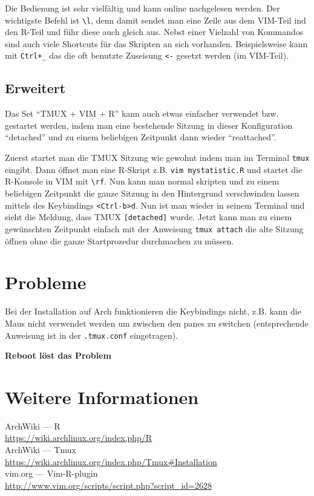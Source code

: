 \documentclass[a4paper,
               10pt,
               fleqn]{article}
\begin{document}
Die Bedienung ist sehr vielfältig und kann online nachgelesen werden.
Der wichtigste Befehl ist \verb!\l!, denn damit sendet man eine Zeile
aus dem VIM-Teil ind den R-Teil und führ diese auch gleich aus.
Nebst einer Vielzahl von Kommandos sind auch viele Shortcuts für das
Skripten an sich vorhanden. Beispielsweise kann mit \verb!Ctrl+_!
das die oft benutzte Zuseisung \verb!<-! gesetzt werden (im VIM-Teil).

\subsection{Erweitert}
Das Set ``TMUX + VIM + R'' kann auch etwas einfacher verwendet bzw.
gestartet werden, indem man eine bestehende Sitzung in dieser 
Konfiguration ``detached'' und zu einem beliebigen Zeitpunkt dann
wieder ``reattached''. 

Zuerst startet man die TMUX Sitzung wie gewohnt indem man im Terminal
\verb!tmux! eingibt. Dann öffnet man eine R-Skript z.B. 
\verb!vim mystatistic.R! und startet die R-Konsole in VIM mit
\verb!\rf!. Nun kann man normal skripten und zu einem beliebigen 
Zeitpunkt die ganze Sitzung in den Hintergrund verschwinden lassen
mittels des Keybindings \verb!<Ctrl-b>d!. Nun ist man wieder in seinem
Terminal und sieht die Meldung, dass TMUX \verb![detached]! wurde.
Jetzt kann man zu einem gewünschten Zeitpunkt einfach mit der Anweisung
\verb!tmux attach! die alte Sitzung öffnen ohne die ganze Startprozedur
durchmachen zu müssen.

\section{Probleme}
Bei der Installation auf Arch funktionieren die Keybindings nicht,
z.B. kann die Maus nicht verwendet werden um zwischen den panes zu 
switchen (entsprechende Anweisung ist in der \verb!.tmux.conf!
eingetragen).

\textbf{Reboot löst das Problem}

\section{Weitere Informationen}
ArchWiki --- R\\
\indent \url{https://wiki.archlinux.org/index.php/R}\\
ArchWiki --- Tmux\\
\indent \url{https://wiki.archlinux.org/index.php/Tmux#Installation}\\
vim.org --- Vim-R-plugin\\
\indent \url{http://www.vim.org/scripts/script.php?script_id=2628}
\end{document}
